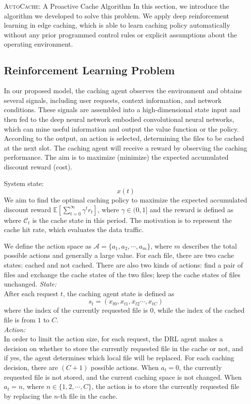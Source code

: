 \documentclass{article}
\begin{document}
\begin{section}{\textsc{AutoCache}: A Proactive Cache Algorithm}
    \label{algorithm}
    In this section, we introduce the algorithm we developed to solve this problem.
    We apply deep reinforcement learning in edge caching, which is able to learn caching policy automatically without any prior programmed control rules or explicit assumptions about the operating environment.

    \subsection{Reinforcement Learning Problem}
    In our proposed model, the caching agent observes the environment and obtains several signals, including user requests, context information, and network conditions. These signals are assembled into a high-dimensional state input and then fed to the deep neural network embodied convolutional neural networks, which can mine useful information and output the value function or the policy. According to the output, an action is selected, determining the files to be cached at the next slot. The caching agent will receive a reward by observing the caching performance. The aim is to maximize (minimize) the expected accumulated discount reward (cost).

    System state:
    $$
    x(t)
    $$
    We aim to find the optimal caching policy to maximize the expected accumulated discount reward $\mathbb{E}\left[\sum_{t=0}^{\infty}\gamma^tr_t\right]$, where $\gamma\in(0,1]$ and the reward is defined as where $\mathcal{C}_t$ is the cache state in this period. The motivation is to represent the cache hit rate, which evaluates the data traffic.

    We define the action space as $\mathcal{A}=\{a_1,a_2,\cdots,a_m\}$, where $m$ describes the total possible actions and generally a large value. For each file, there are two cache states: cached and not cached. There are also two kinds of actions: find a pair of files and exchange the cache states of the two files; keep the cache states of files unchanged.
    \emph{State:}\\
    After each request $t$, the caching agent state is defined as
    $$
        s_t=\left(x_{t0},x_{t1},x_{t2}\cdots,x_{tC}\right)
    $$
    where the index of the currently requested file is $0$, while the index of the cached file is from $1$ to $C$.\\
    \emph{Action:}\\
    In order to limit the action size, for each request, the DRL agent makes a decision on whether to store the currently requested file in the cache or not, and if yes, the agent determines which local file will be replaced. For each caching decision, there are $(C+1)$ possible actions. When $a_t=0$, the currently requested file is not stored, and the current caching space is not changed. When $a_t=n$, where $n\in\{1,2,\cdots,C\}$, the action is to store the currently requested file by replacing the $n$-th file in the cache.


\end{section}
\end{document}
